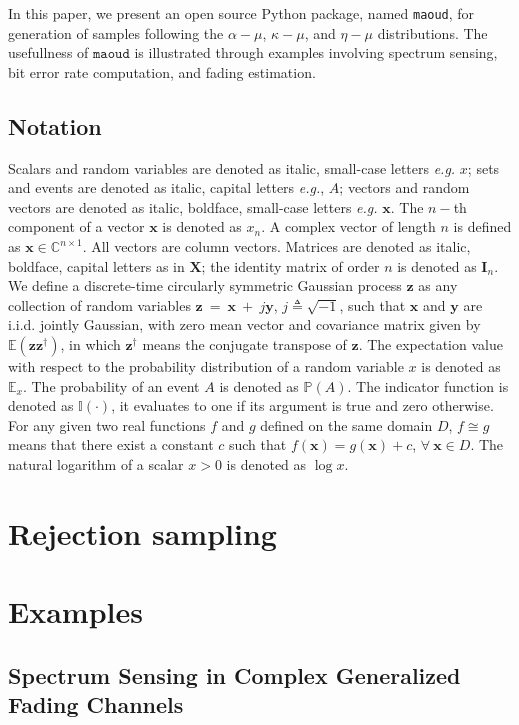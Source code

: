 \documentclass[conference, 10pt]{IEEEtran}
\begin{document}
In this paper, we present an open source Python package, named \texttt{maoud},
for generation of samples following the $\alpha-\mu$, $\kappa-\mu$, and
$\eta-\mu$ distributions. The usefullness of $\texttt{maoud}$ is illustrated
through examples involving spectrum sensing, bit error rate computation, and
fading estimation.

\subsection*{Notation}
Scalars and random variables are denoted as italic, small-case letters
\textit{e.g.} $x$; sets and events are denoted as italic, capital
letters \textit{e.g.}, $A$; vectors and random vectors are denoted as
italic, boldface, small-case letters \textit{e.g.} $\bm{x}$. The $n-$th
component of a vector $\bm{x}$ is denoted as $x_n$. A complex vector of length
$n$ is defined as $\bm{x} \in \mathbb{C}^{n\times 1}$. All vectors are column
vectors. Matrices are denoted as italic, boldface, capital letters as
in $\bm{X}$; the identity matrix of order $n$ is denoted as $\bm{I}_n$. We
define a discrete-time circularly symmetric Gaussian process $\bm{z}$ as any
collection of random variables $\bm{z}~=~\bm{x}~+~j\bm{y}$,
$j \triangleq \sqrt{-1}$, such that $\bm{x}$ and $\bm{y}$ are i.i.d. jointly
Gaussian, with zero mean vector and covariance matrix given by
$\mathbb{E}\left(\bm{z}\bm{z}^{\dagger}\right)$, in which $\bm{z}^\dagger$ means
the conjugate transpose of $\bm{z}$. The expectation value with respect to the
probability distribution of a random variable $x$ is denoted as $\mathbb{E}_x$.
The probability of an event $A$ is denoted as $\mathbb{P}(A)$. The indicator
function is denoted as $\mathbb{I}(\cdot)$, it evaluates to one if its argument
is true and zero otherwise. For any given two real functions $f$ and $g$ defined
on the same domain $D$, $f \cong g$ means that there exist a constant $c$ such that
$f(\bm{x}) = g(\bm{x}) + c$, $\forall~ \bm{x} \in D$. The natural logarithm of a
scalar $x > 0$ is denoted as $\log x$.

\section{Rejection sampling}

\section{Examples}
\subsection{Spectrum Sensing in Complex Generalized Fading Channels}
\end{document}
